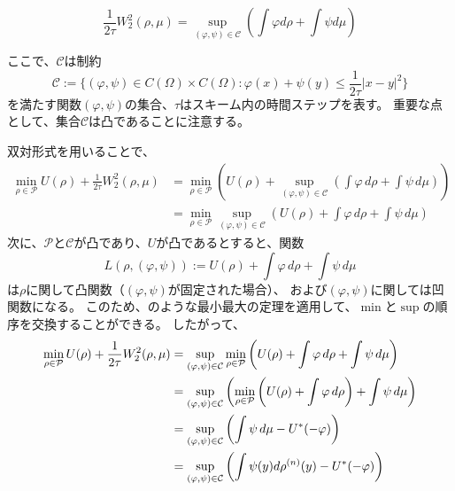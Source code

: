 \begin{equation}
    \label{eq:wasserstein dual}
    \frac{1}{2\tau} W_2^2(\rho, \mu) = \sup_{(\varphi, \psi) \in \mathcal{C}} \left( \int \varphi d\rho + \int \psi d\mu \right)
\end{equation}

ここで、$\mathcal{C}$は制約
\[
    \mathcal{C}  := \{(\varphi, \psi) \in C(\Omega) \times C(\Omega) : \varphi(x) + \psi(y) \leq \frac{1}{2 \tau} |x - y|^2 \}
\]
を満たす関数$(\varphi, \psi)$の集合、$\tau$はスキーム内の時間ステップを表す。
重要な点として、集合$\mathcal{C}$は凸であることに注意する。

双対形式を用いることで、
\begin{align*}
    \min_{\rho \in \mathcal{P}} U(\rho) + \frac{1}{2\tau} W_2^2(\rho, \mu) &= \min_{\rho \in \mathcal{P}} \left(U(\rho) + \sup_{(\varphi, \psi) \in \mathcal{C}} \left(\int \varphi \, d\rho + \int \psi \, d\mu\right)\right)\\
                                                                            &= \min_{\rho \in \mathcal{P}} \sup_{(\varphi, \psi) \in \mathcal{C}} \left(U(\rho) + \int \varphi \, d\rho + \int \psi \, d\mu\right)
  \end{align*}
  次に、\(\mathcal{P}\)と\(\mathcal{C}\)が凸であり、\(U\)が凸であるとすると、関数
  \[
    \label{eq:L}
    L(\rho, (\varphi, \psi)) := U(\rho) + \int \varphi \, d\rho + \int \psi \, d\mu
  \]
  は\hypertarget{rho_convex}{\(\rho\)に関して凸関数}（\((\varphi, \psi)\)が固定された場合）、
  および\hypertarget{varphipsi_concave}{\((\varphi, \psi)\)に関しては凹関数}になる。
  このため、\cite[Prop. 2.4 (p176)]{MR1727362}のような最小最大の定理を適用して、\(\min\)と\(\sup\)の順序を交換することができる。
  したがって、
  \begin{align}
    \label{eq:dual}
    \min_{\rho \in \mathcal{P}} U(\rho) + \frac{1}{2\tau} W_2^2(\rho, \mu) &= \sup_{(\varphi, \psi) \in \mathcal{C}} \min_{\rho \in \mathcal{P}} \left(U(\rho) + \int \varphi \, d\rho + \int \psi \, d\mu \right)  \notag\\
                                                                            &= \sup_{(\varphi, \psi) \in \mathcal{C}} \left(\min_{\rho \in \mathcal{P}} \left(U(\rho) + \int \varphi \, d\rho\right) + \int \psi \, d\mu\right)  \notag\\
                                                                            &= \sup_{(\varphi, \psi) \in \mathcal{C}} \left(\int \psi \, d\mu - U^*(- \varphi)\right)  \\
                                                                            &= \sup_{(\varphi,\psi) \in \mathcal{C}} \left( \int \psi(y) d\rho^{(n)}(y) - U^*(- \varphi) \right)\notag
  \end{align}
